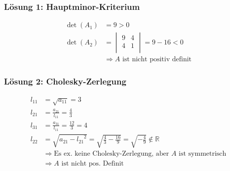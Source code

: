 \subsubsection*{Lösung 1: Hauptminor-Kriterium}

\begin{align}
	\det(A_1) &= 9 > 0\\
	\det(A_2) &= 
		\begin{vmatrix}
			9 & 4 \\
			4 & 1 \\
		\end{vmatrix} = 9 - 16 < 0\\
	&\Rightarrow \text{$A$ ist nicht positiv definit}
\end{align}

\subsubsection*{Lösung 2: Cholesky-Zerlegung}
\begin{align}
	l_{11} &= \sqrt{a_{11}} = 3\\
	l_{21} &= \frac{a_{21}}{l_{11}} = \frac{4}{3}\\
	l_{31} &= \frac{a_{31}}{l_{11}} = \frac{12}{3} = 4\\
	l_{22} &= \sqrt{a_{21} - {l_{21}}^2} = \sqrt{\frac{4}{3} - \frac{16}{9}}= \sqrt{-\frac{4}{9}} \notin \mathbb{R}\\
 & \Rightarrow \text{Es ex. keine Cholesky-Zerlegung, aber $A$ ist symmetrisch}\\
 & \Rightarrow \text{$A$ ist nicht pos. Definit}
\end{align}

